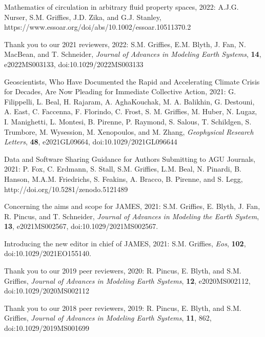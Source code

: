 \begin{etaremune}

\item Mathematics of circulation in arbitrary fluid property spaces, 2022: A.J.G. Nurser, S.M. Grif\/f\/ies, J.D. Zika, and G.J. Stanley,  https://www.essoar.org/doi/abs/10.1002/essoar.10511370.2


\item Thank you to our 2021 reviewers, 2022:  S.M. Grif\/f\/ies, E.M. Blyth, J. Fan, N. MacBean, and  T. Schneider, {\it Journal of Advances in Modeling Earth Systems}, {\bf 14}, e2022MS003133, doi:10.1029/2022MS003133

\item Geoscientists, Who Have Documented the Rapid and Accelerating Climate Crisis for Decades, Are Now Pleading for Immediate Collective Action, 2021: 
G. Filippelli, L. Beal, H. Rajaram, A. AghaKouchak, M. A. Balikhin, G. Destouni, A. East, C. Faccenna, F. Florindo, C. Frost, S. M. Grif\/f\/ies, M. Huber, N. Lugaz, I. Manighetti, L. Montesi, B. Pirenne, P. Raymond, S. Salous, T. Schildgen, S. Trumbore, M. Wysession, M. Xenopoulos, and M. Zhang, {\it Geophysical Research Letters}, {\bf 48}, e2021GL09664, doi:10.1029/2021GL096644

\item Data and Software Sharing Guidance for Authors Submitting to AGU Journals, 2021: P. Fox, C. Erdmann, S. Stall, S.M. Grif\/f\/ies, L.M. Beal, N. Pinardi, B. Hanson, M.A.M. Friedrichs, S. Feakins, A. Bracco, B. Pirenne, and S. Legg,  http://doi.org/10.5281/zenodo.5121489

\item Concerning the aims and scope for JAMES, 2021: S.M. Grif\/f\/ies, E. Blyth, J. Fan, R. Pincus, and T. Schneider, {\it Journal of Advances in Modeling the Earth System}, {\bf 13},  e2021MS002567, doi:10.1029/2021MS002567.

\item Introducing the new editor in chief of JAMES, 2021: S.M. Grif\/f\/ies, {\it Eos}, {\bf 102}, doi:10.1029/2021EO155140. 

\item Thank you to our 2019 peer reviewers, 2020: R. Pincus, E. Blyth, and S.M. Grif\/f\/ies, {\it Journal of Advances in Modeling Earth Systems}, {\bf 12}, e2020MS002112, doi:10.1029/2020MS002112

\item Thank you to our 2018 peer reviewers, 2019: R. Pincus, E. Blyth, and S.M. Grif\/f\/ies, {\it Journal of Advances in Modeling Earth Systems}, {\bf 11}, 862, doi:10.1029/2019MS001699


\end{etaremune}
